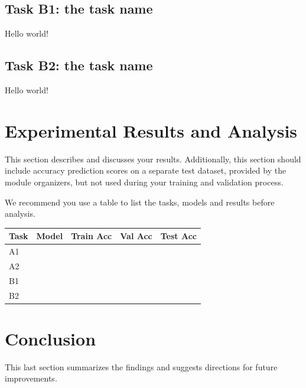 \documentclass{article}
\begin{document}
    \subsection{Task B1: the task name}
    \label{ssec:models_A1}
    Hello world!
    \subsection{Task B2: the task name}
    \label{ssec:models_A1}
    Hello world!

\section{Experimental Results and Analysis}
\label{sec:results}
    This section describes and discusses your results. Additionally, this section should include accuracy prediction scores on a separate test dataset, provided by the module organizers, but not used during your training and validation process.
    
    We recommend you use a table to list the tasks, models and results before analysis.
    

    \begin{table}[]
    \label{table:Table1}
    \begin{tabular}{@{}lllll@{}}
    \toprule
    Task & Model & Train Acc & Val Acc & Test Acc \\ \midrule
    A1   &       &           &         &          \\
    A2   &       &           &         &          \\
    B1   &       &           &         &          \\
    B2   &       &           &         &          \\ \bottomrule
    \end{tabular}
    \end{table}

\section{Conclusion}
\label{sec:conc}
    This last section summarizes the findings and suggests directions for future improvements.

\vfill\pagebreak



\end{document}
